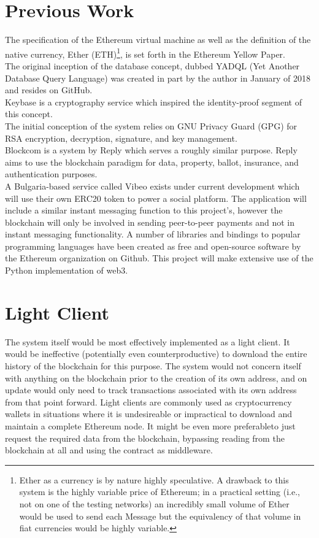 \documentclass[]{article}
\begin{document}
\section{Previous Work}
The specification of the Ethereum virtual machine as well as the definition of the native currency, Ether (ETH)\footnote{Ether as a currency is by nature highly speculative. A drawback to this system is the highly variable price of Ethereum; in a practical setting (i.e., not on one of the testing networks) an incredibly small volume of Ether would be used to send each Message but the equivalency of that volume in fiat currencies would be highly variable.}, is set forth in the Ethereum Yellow Paper.\cite{yellowpaper}\\
The original inception of the database concept, dubbed YADQL (Yet Another Database Query Language) was created in part by the author in January of 2018 and resides on GitHub.\cite{yadql}\\
Keybase is a cryptography service which inspired the identity-proof segment of this concept.\cite{keybase}\\
The initial conception of the system relies on GNU Privacy Guard (GPG) for RSA encryption, decryption, signature, and key management\cite{gpg}.\\
Blockcom is a system by Reply which serves a roughly similar purpose. Reply aims to use the blockchain paradigm for data, property, ballot, insurance, and authentication purposes.\cite{reply}\\
A Bulgaria-based service called Vibeo exists under current development which will use their own ERC20 token to power a social platform. The application will include a similar instant messaging function to this project's, however the blockchain will only be involved in sending peer-to-peer payments and not in instant messaging functionality.\cite{vibeo}
A number of libraries and bindings to popular programming languages have been created as free and open-source software by the Ethereum organization on Github.\cite{ethereum} This project will make extensive use of the Python implementation of web3.\cite{web3-py}

\section{Light Client}
The system itself would be most effectively implemented as a light client. It would be ineffective (potentially even counterproductive) to download the entire history of the blockchain for this purpose. The system would not concern itself with anything on the blockchain prior to the creation of its own address, and on update would only need to track transactions associated with its own address from that point forward. Light clients are commonly used as cryptocurrency wallets in situations where it is undesireable or impractical to download and maintain a complete Ethereum node. It might be even more preferableto just request the required data from the blockchain, bypassing reading from the blockchain at all and using the contract as middleware.
\end{document}
